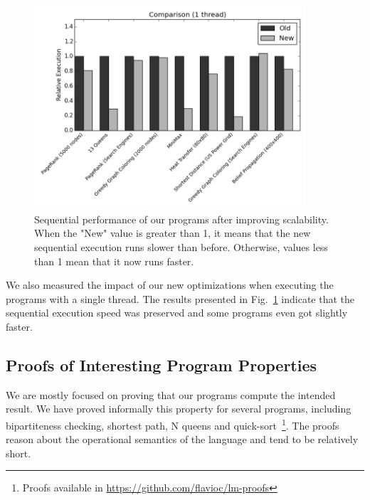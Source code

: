 \documentclass[10pt]{article}
\begin{document}
\begin{figure}[b]
\begin{center}
   \includegraphics[width=0.9\textwidth]{figures/comparison1}
\end{center}
\caption{Sequential performance of our programs after improving scalability.
   When the "New" value is greater than 1, it means that the new sequential
   execution runs slower than before. Otherwise, values less than 1 mean that it
   now runs faster.}
\label{fig:seq}
\end{figure}

We also measured the impact of our new optimizations when executing the programs
with a single thread. The results presented in Fig.~\ref{fig:seq} indicate
that the sequential execution speed was preserved and some programs even got slightly
faster.

\subsection{Proofs of Interesting Program Properties}

We are mostly focused on proving that our programs compute the intended result.
We have proved informally this property for several programs, including
bipartiteness checking, shortest path, N queens and quick-sort~\footnote{Proofs
available in \url{https://github.com/flavioc/lm-proofs}}.
The proofs reason about the operational semantics of the language and tend to be
relatively short.
\end{document}
